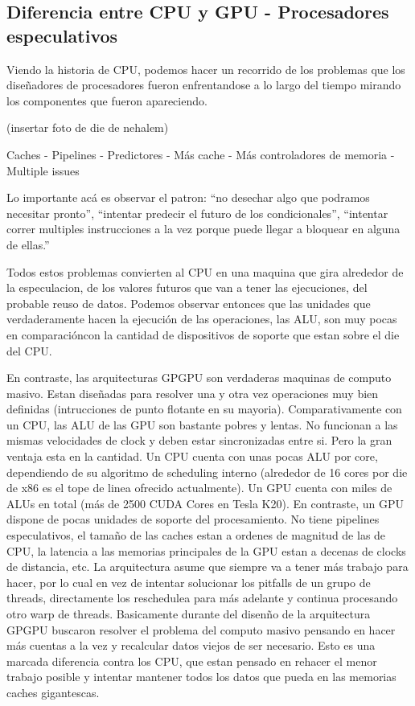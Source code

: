 \subsection{Diferencia entre CPU y GPU - Procesadores especulativos}
Viendo la historia de CPU, podemos hacer un recorrido de los problemas que los dise\~nadores de procesadores
fueron enfrentandose a lo largo del tiempo mirando los componentes que fueron apareciendo.

(insertar foto de die de nehalem)

Caches - Pipelines - Predictores - M\'as cache - M\'as controladores de memoria - Multiple issues

Lo importante ac\'a es observar el patron: ``no desechar algo que podramos necesitar pronto'',
``intentar predecir el futuro de los condicionales'', ``intentar correr multiples instrucciones a la vez
porque puede llegar a bloquear en alguna de ellas.''

Todos estos problemas convierten al CPU en una maquina que gira alrededor de la especulacion,
de los valores futuros que van a tener las ejecuciones, del probable reuso de datos.
Podemos observar entonces que las unidades que verdaderamente hacen la ejecuci\'on de las operaciones,
las ALU, son muy pocas en comparaci\'oncon la cantidad de dispositivos de soporte que estan
sobre el die del CPU.

En contraste, las arquitecturas GPGPU son verdaderas maquinas de computo masivo. Estan dise\~nadas para
resolver una y otra vez operaciones muy bien definidas (intrucciones de punto flotante en su mayoria).
Comparativamente con un CPU, las ALU de las GPU son bastante pobres y lentas. No funcionan a las mismas
velocidades de clock y deben estar sincronizadas entre si. Pero la gran ventaja esta en la cantidad.
Un CPU cuenta con unas pocas ALU por core, dependiendo de su algoritmo de scheduling interno
(alrededor de 16 cores por die de x86 es el tope de linea ofrecido actualmente). Un GPU cuenta con miles de ALUs en total
(m\'as de 2500 CUDA Cores en Tesla K20).
En contraste, un GPU dispone de pocas unidades de soporte del procesamiento. No tiene pipelines especulativos, el tama\~no de las caches
estan a ordenes de magnitud de las de CPU, la latencia a las memorias principales de la GPU estan a
decenas de clocks de distancia, etc. La arquitectura asume que siempre va a tener m\'as trabajo
para hacer, por lo cual en vez de intentar solucionar los pitfalls de un grupo de threads, directamente
los reschedulea para m\'as adelante y continua procesando otro warp de threads. Basicamente durante del
disen\~no de la arquitectura GPGPU buscaron resolver el problema del computo masivo pensando en hacer
m\'as cuentas a la vez y recalcular datos viejos de ser necesario. Esto es una marcada diferencia contra
los CPU, que estan pensado en rehacer el menor trabajo posible y intentar mantener todos los datos que pueda en
las memorias caches gigantescas.

